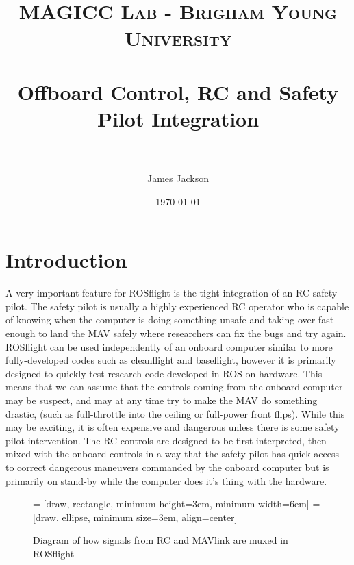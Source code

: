 \documentclass[paper=a4, fontsize=11pt]{scrartcl} %
\title{
\normalfont \normalsize
\textsc{MAGICC Lab - Brigham Young University} \\ [25pt] %
\horrule{0.5pt} \\[0.4cm] %
\huge Offboard Control, RC and Safety Pilot Integration \\ %
\horrule{2pt} \\[0.5cm] %
}
\author{James Jackson} %
\date{\normalsize\today} %
\begin{document}
\maketitle %


\section{Introduction}

A very important feature for ROSflight is the tight integration of an RC safety pilot.  The safety pilot is usually a highly experienced RC operator who is capable of knowing when the computer is doing something unsafe and taking over fast enough to land the MAV safely where researchers can fix the bugs and try again.  ROSflight can be used independently of an onboard computer similar to more fully-developed codes such as cleanflight and baseflight, however it is primarily designed to quickly test research code developed in ROS on hardware.  This means that we can assume that the controls coming from the onboard computer may be suspect, and may at any time try to make the MAV do something drastic, (such as full-throttle into the ceiling or full-power front flips).  While this may be exciting, it is often expensive and dangerous unless there is some safety pilot intervention.  The RC controls are designed to be first interpreted, then mixed with the onboard controls in a way that the safety pilot has quick access to correct dangerous maneuvers commanded by the onboard computer but is primarily on stand-by while the computer does it's thing with the hardware.

\begin{figure}
	\centering

	 = [draw, rectangle, 
    					minimum height=3em, minimum width=6em]
  =[draw, ellipse, minimum size=3em,
    					align=center]

  \begin{adjustbox}{max size={\textwidth}{0.2\textheight}}
  \end{adjustbox}

	\label{mux_configuration}
	\caption{Diagram of how signals from RC and MAVlink are muxed in ROSflight}
\end{figure}
\end{document}
